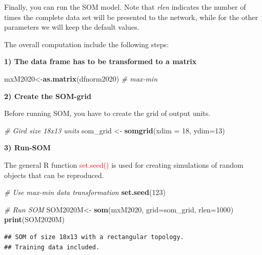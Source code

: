 \documentclass[
]{book}
\newenvironment{Shaded}{\begin{snugshade}}{\end{snugshade}}
\newcommand{\AttributeTok}[1]{\textcolor[rgb]{0.13,0.29,0.53}{#1}}
\newcommand{\CommentTok}[1]{\textcolor[rgb]{0.56,0.35,0.01}{\textit{#1}}}
\newcommand{\DecValTok}[1]{\textcolor[rgb]{0.00,0.00,0.81}{#1}}
\newcommand{\FunctionTok}[1]{\textcolor[rgb]{0.13,0.29,0.53}{\textbf{#1}}}
\newcommand{\NormalTok}[1]{#1}
\newcommand{\OtherTok}[1]{\textcolor[rgb]{0.56,0.35,0.01}{#1}}
\begin{document}
Finally, you can run the SOM model.
Note that \emph{rlen} indicates the number of times the complete data set will be presented to the network, while for the other parameters we will keep the default values.

The overall computation include the following steps:

\textbf{1) The data frame has to be transformed to a matrix}

\begin{Shaded}
\begin{Highlighting}[]
\NormalTok{mxM2020}\OtherTok{\textless{}{-}}\FunctionTok{as.matrix}\NormalTok{(dfnorm2020) }\CommentTok{\# max{-}min}
\end{Highlighting}
\end{Shaded}

\textbf{2) Create the SOM-grid}

Before running SOM, you have to create the grid of output units.

\begin{Shaded}
\begin{Highlighting}[]
\CommentTok{\# Gird size 18x13 units}
\NormalTok{som\_grid }\OtherTok{\textless{}{-}} \FunctionTok{somgrid}\NormalTok{(}\AttributeTok{xdim =} \DecValTok{18}\NormalTok{, }\AttributeTok{ydim=}\DecValTok{13}\NormalTok{) }
\end{Highlighting}
\end{Shaded}

\textbf{3) Run-SOM}

The general R function \textcolor{red}{set.seed()} is used for creating simulations of random objects that can be reproduced.

\begin{Shaded}
\begin{Highlighting}[]
\CommentTok{\# Use max{-}min data transformation}
\FunctionTok{set.seed}\NormalTok{(}\DecValTok{123}\NormalTok{) }

\CommentTok{\# Run SOM}
\NormalTok{SOM2020M}\OtherTok{\textless{}{-}} \FunctionTok{som}\NormalTok{(mxM2020,}
               \AttributeTok{grid=}\NormalTok{som\_grid, }
               \AttributeTok{rlen=}\DecValTok{1000}\NormalTok{)}
\FunctionTok{print}\NormalTok{(SOM2020M)}
\end{Highlighting}
\end{Shaded}

\begin{verbatim}
## SOM of size 18x13 with a rectangular topology.
## Training data included.
\end{verbatim}
\end{document}
